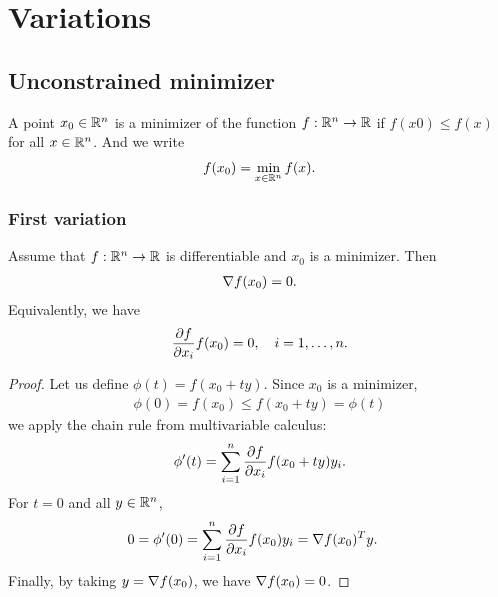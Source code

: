 \setchapterpreamble[u]{\margintoc}
\chapter{Variations}

\section{Unconstrained minimizer}

\begin{definition}
A point $x_0 \in \mathbb{R}^n$ is a minimizer of the function $f: \mathbb{R}^n \to \mathbb{R}$ if $f(x0) \le f(x)$ for all $x \in \mathbb{R}^n$.
And we write 
\begin{align}
f(x_0) = \min_{x\in\mathbb{R}^n} f(x).
\end{align}
\end{definition}

\subsection{First variation}

\begin{theorem}
Assume that $f: \mathbb{R}^n \to \mathbb{R}$ is differentiable and $x_0$ is a minimizer.
Then
\begin{align}
\nabla f(x_0) = 0.
\end{align}
Equivalently, we have
\begin{align}
\frac{\partial f}{\partial x_i} f(x_0) = 0, \quad i = 1, \dots, n.
\end{align}
\end{theorem}

\begin{proof}
Let us define $\phi(t) = f(x_0 + ty)$.
Since $x_0$ is a minimizer,
\begin{align}
\phi(0) = f(x_0) \le f(x_0 + ty) = \phi(t)
\end{align}
we apply the chain rule from multivariable calculus:
\begin{align}
\phi'(t) = \sum _{i=1}^{n} \frac{\partial f}{\partial x_i} f(x_0 + ty) y_i.
\end{align}
For $t=0$ and all $y \in \mathbb{R}^n$,
\begin{align}
0 = \phi'(0) &= \sum _{i=1}^{n} \frac{\partial f}{\partial x_i} f(x_0) y_i = \nabla f(x_0) ^T y.
\end{align}
Finally, by taking $y=\nabla f(x_0)$, we have $\nabla f(x_0) = 0$.
\end{proof}

